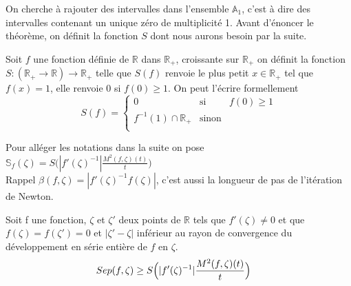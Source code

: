 \documentclass[a4paper,10.5pt]{article}
\begin{document}
	\noindent On cherche à rajouter des intervalles dans l'ensemble $\mathbb{A}_1$, c'est à dire des intervalles contenant un unique zéro de multiplicité 1.
	Avant d'énoncer le théorème, on définit la fonction $S$ dont nous aurons besoin par la suite. 
	\begin{definition} Soit $f$ une fonction définie de $\mathbb{R}$ dans $\mathbb{R}_+$, croissante sur $\mathbb{R}_+$ on définit la fonction $S:(\mathbb{R}_+ \rightarrow \mathbb{R}) \longrightarrow \mathbb{R}_+$  telle que $S(f)$ renvoie le plus petit $x \in \mathbb{R}_+$ tel que $f(x)=1$, elle renvoie 0 si $f(0) \geq1$. On  peut l'écrire formellement
		\begin{equation}
		S(f)=
		\left\lbrace
		\begin{array}{ccc}
		0  & \mbox{si} & f(0) \geq 1\\
		f^{-1}(1)\cap \mathbb{R}_{+} & \mbox{sinon}\\
		\end{array}\right.
		\end{equation}
	\end{definition}
	\vspace{7mm}
	Pour alléger les notations dans la suite on pose $\mathbb{S}_{f}(\zeta)=S\Big(|f'(\zeta)^{-1}|\frac{M^{2}(f,\zeta)(t)}{t}\Big)$\\
	Rappel $\beta(f,\zeta)=|f'(\zeta)^{-1}f(\zeta)|$, c'est aussi la longueur de pas de l'itération de Newton.
	\vspace{7mm}
	\begin{theorem}	Soit f une fonction, $\zeta$ et $\zeta '$ deux points de $\mathbb{R}$ tels que $f'(\zeta)\neq 0$ et que $f(\zeta)=f(\zeta ')=0$ et $|\zeta '-\zeta|$ inférieur au rayon de convergence du développement en série entière de $f$ en $\zeta$. 
		\[Sep(f,\zeta) \geq S\Big(|f'(\zeta)^{-1}|\frac{M^{2}(f,\zeta)(t)}{t}\Big) \hspace{4mm} \]
	\end{theorem}
\end{document}
